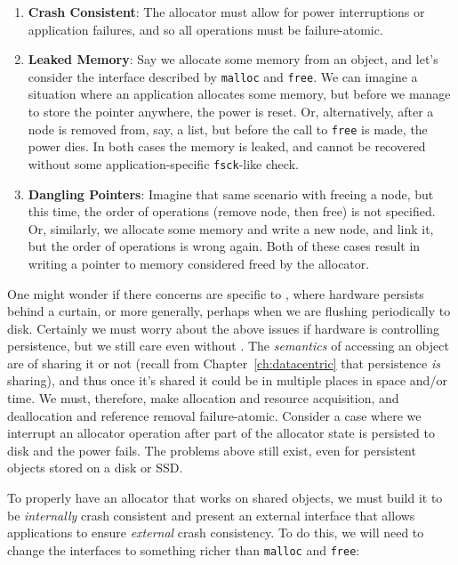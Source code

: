 \begin{enumerate}
    \item \textbf{Crash Consistent}: The allocator must allow for power interruptions or application failures, and so
          all operations must be failure-atomic.
    \item \textbf{Leaked Memory}: Say we allocate some memory from an object, and let's consider the interface described
          by \texttt{malloc} and \texttt{free}. We can imagine a situation where an application allocates some memory, but
          before we manage to store the pointer anywhere, the power is reset. Or, alternatively, after a node is removed from,
          say, a list, but before the call to \texttt{free} is made, the power dies. In both cases the memory is leaked, and
          cannot be recovered without some application-specific \texttt{fsck}-like check.
    \item \textbf{Dangling Pointers}: Imagine that same scenario with freeing a node, but this time, the order of operations
          (remove node, then free) is not specified. Or, similarly, we allocate some memory and write a new node, and link it, but the order of operations is
          wrong again. Both of these cases result in writing a pointer to memory considered freed by the allocator.
\end{enumerate}

One might wonder if there concerns are specific to \NVM, where hardware persists behind a curtain, or more generally,
perhaps when we are flushing periodically to disk. Certainly we must worry about the above issues if hardware is
controlling persistence, but we still care even without \NVM. The \emph{semantics} of accessing an object are of sharing
it or not (recall from Chapter~\ref{ch:datacentric} that persistence \emph{is} sharing), and thus once it's shared it
could be in multiple places in space and/or time. We must, therefore, make allocation and resource acquisition, and
deallocation and reference removal failure-atomic. Consider a case where we interrupt an allocator operation after part
of the allocator state is persisted to disk and the power fails. The problems above still exist, even for persistent
objects stored on a disk or SSD.

To properly have an allocator that works on shared objects, we must build it to be \emph{internally} crash consistent and
present an external interface that allows applications to ensure \emph{external} crash consistency.
To do this, we will
need to change the interfaces to something richer than \texttt{malloc} and \texttt{free}:

